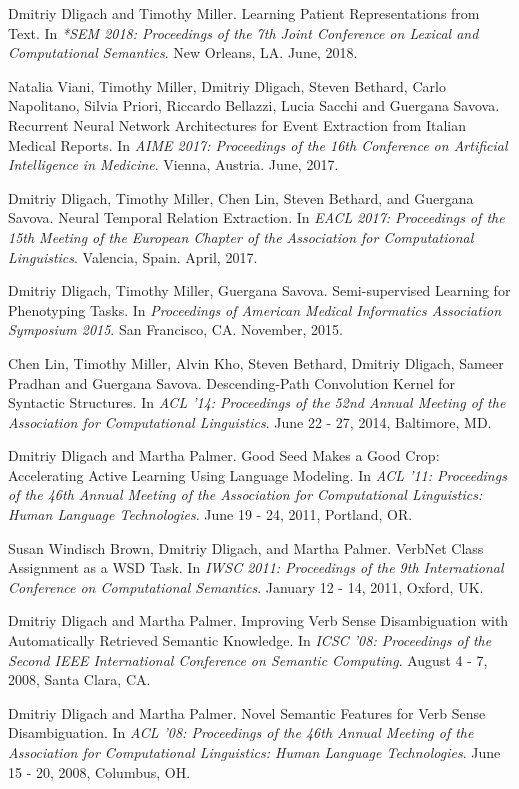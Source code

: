\documentclass[letterpaper]{article}
\renewenvironment{itemize}{
  \begin{list}{}{
    \setlength{\leftmargin}{1.5em}
  }
}{
  \end{list}
}
\begin{document}
\begin{itemize}
\item Dmitriy Dligach and Timothy Miller. Learning Patient Representations from Text. In \emph{*SEM 2018: Proceedings of the 7th Joint Conference on Lexical and Computational Semantics}. New Orleans, LA. June, 2018.
\item Natalia Viani, Timothy Miller, Dmitriy Dligach, Steven Bethard, Carlo Napolitano, Silvia Priori, Riccardo Bellazzi, Lucia Sacchi and Guergana Savova. Recurrent Neural Network Architectures for Event Extraction from Italian Medical Reports. In \emph{AIME 2017: Proceedings of the 16th Conference on Artificial Intelligence in Medicine}. Vienna, Austria. June, 2017.
\item Dmitriy Dligach, Timothy Miller, Chen Lin, Steven Bethard, and Guergana Savova. Neural Temporal Relation Extraction. In \emph{EACL 2017: Proceedings of the 15th Meeting of the European Chapter of the Association
for Computational Linguistics}. Valencia, Spain. April, 2017.
\item Dmitriy Dligach, Timothy Miller, Guergana Savova. Semi-supervised Learning for Phenotyping Tasks. In \emph{Proceedings of American Medical Informatics Association Symposium 2015}. San Francisco, CA. November, 2015.
\item Chen Lin, Timothy Miller, Alvin Kho, Steven Bethard, Dmitriy Dligach, Sameer Pradhan and Guergana Savova. Descending-Path Convolution Kernel for Syntactic Structures. In \emph {ACL '14: Proceedings of the 52nd Annual Meeting of the Association for Computational Linguistics}. June 22 - 27, 2014, Baltimore, MD.
\item Dmitriy Dligach and Martha Palmer. Good Seed Makes a Good Crop: Accelerating Active Learning Using Language Modeling. In \emph {ACL '11: Proceedings of the 46th Annual Meeting of the Association for Computational Linguistics: Human Language Technologies}. June 19 - 24, 2011, Portland, OR.
\item Susan Windisch Brown, Dmitriy Dligach, and Martha Palmer. VerbNet Class Assignment as a WSD Task. In \emph {IWSC 2011: Proceedings of the 9th International Conference on Computational Semantics}. January 12 - 14, 2011, Oxford, UK.
\item Dmitriy Dligach and Martha Palmer. Improving Verb Sense Disambiguation with Automatically Retrieved Semantic Knowledge. In \emph {ICSC '08: Proceedings of the Second IEEE International Conference on Semantic Computing}. August 4 - 7, 2008, Santa Clara, CA.
\item Dmitriy Dligach and Martha Palmer. Novel Semantic Features for Verb Sense Disambiguation. In \emph {ACL '08: Proceedings of the 46th Annual Meeting of the Association for Computational Linguistics: Human Language Technologies}. June 15 - 20, 2008, Columbus, OH.

\end{itemize}
\end{document}
